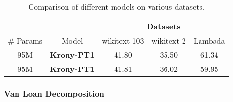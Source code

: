 \documentclass{article}
\begin{document}
{\begin{table}[h]
\centering
\begin{tabular}{|c|c|c|c|c|}
\hline

 & & \multicolumn{3}{c|}{Datasets} \\ \hline
\# Params &  Model            & wikitext-103 & wikitext-2 & Lambada \\ \hline
95M       & \textbf{Krony-PT1}  & 41.80        & 35.50      & 61.34         \\ \hline
95M       & \textbf{Krony-PT1}  & 41.81        & 36.02      & 59.95         \\ \hline
\end{tabular}
\caption{Comparison of different models on various datasets.}
\end{table}

\subsubsection{Van Loan Decomposition}


\begin{comment}
The Van Loan (VL) decomposition provides a framework to represnt a matrix \( Z \) as a sum of Kronecker products of smaller matrices. The general form of the decomposition is given by:
\begin{equation}
    Z = \sum_{i=1}^k A_i \otimes B_i,
\end{equation}
where \( A_i \) and \( B_i \) are matrices of appropriate dimensions, and \( \otimes \) denotes the Kronecker product. 


\paragraph{Kronecker Product}
The Kronecker product, central to this decomposition, is defined for two matrices \( A \) of size \( m \times n \) and \( B \) of size \( p \times q \) as:
\begin{equation}
    A \otimes B = 
    \begin{pmatrix}
    a_{11}B & \cdots & a_{1n}B \\
    \vdots & \ddots & \vdots \\
    a_{m1}B & \cdots & a_{mn}B
    \end{pmatrix},
\end{equation}
which results in a block matrix of size \( (mp) \times (nq) \).
\end{comment}

}
\end{document}
